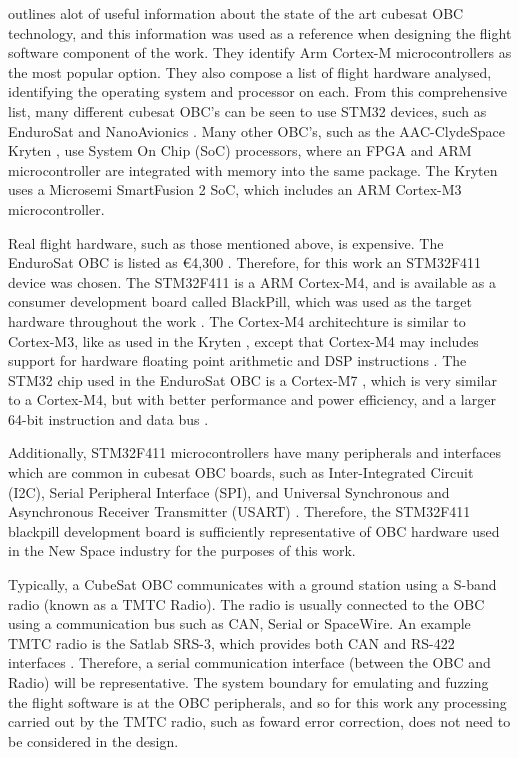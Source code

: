 \documentclass[../report.tex]{subfiles}
\begin{document}
\citet{Cratere_2024} outlines alot of useful information about the state of the
art cubesat OBC technology, and this information was used as a reference when
designing the flight software component of the work. They identify Arm Cortex-M
microcontrollers as the most popular option. They also compose a list of flight
hardware analysed, identifying the operating system and processor on each.
From this comprehensive list, many different cubesat OBC's can be seen to use
STM32 devices, such as EnduroSat \citep{EnduroSat_OBC} and NanoAvionics
\citep{Nano_OBC}. Many other OBC's, such as the AAC-ClydeSpace Kryten
\citep{Clydespace_Kryten}, use System On Chip (SoC) processors, where an FPGA
and ARM microcontroller are integrated with memory into the same package. The
Kryten uses a Microsemi SmartFusion 2 SoC, which includes an ARM Cortex-M3
microcontroller.

Real flight hardware, such as those mentioned above, is expensive. The
EnduroSat OBC is listed as €4,300 \citep{EnduroSat_OBC}. Therefore, for this
work an STM32F411 device was chosen. The STM32F411 is a ARM Cortex-M4, and is
available as a consumer development board called BlackPill, which was used as
the target hardware throughout the work \citep{blackpill_info}. The Cortex-M4
architechture is similar to Cortex-M3, like as used in the Kryten
\citep{Clydespace_Kryten}, except that Cortex-M4 may includes support for
hardware floating point arithmetic and DSP instructions \citep{Cortex_M3}
\citep{Cortex_M4}. The STM32 chip used in the EnduroSat OBC is a Cortex-M7
\citep{EnduroSat_OBC}, which is very similar to a Cortex-M4, but with better
performance and power efficiency, and a larger 64-bit instruction and data bus
\citep{Cortex_M7}.

Additionally, STM32F411 microcontrollers have many peripherals and interfaces
which are common in cubesat OBC boards, such as Inter-Integrated Circuit (I2C),
Serial Peripheral Interface (SPI), and Universal Synchronous and Asynchronous
Receiver Transmitter (USART) \citep{Cratere_2024}. Therefore, the STM32F411
blackpill development board is sufficiently representative of OBC hardware used
in the New Space industry for the purposes of this work.

Typically, a CubeSat OBC communicates with a ground station using a S-band
radio (known as a TMTC Radio). The radio is usually connected to the OBC using
a communication bus such as CAN, Serial or SpaceWire. An example TMTC radio is
the Satlab SRS-3, which provides both CAN and RS-422 interfaces
\citep{Satlab_SRS3}. Therefore, a serial communication interface (between the
OBC and Radio) will be representative. The system boundary for emulating and
fuzzing the flight software is at the OBC peripherals, and so for this work any
processing carried out by the TMTC radio, such as foward error correction, does
not need to be considered in the design.
\end{document}
